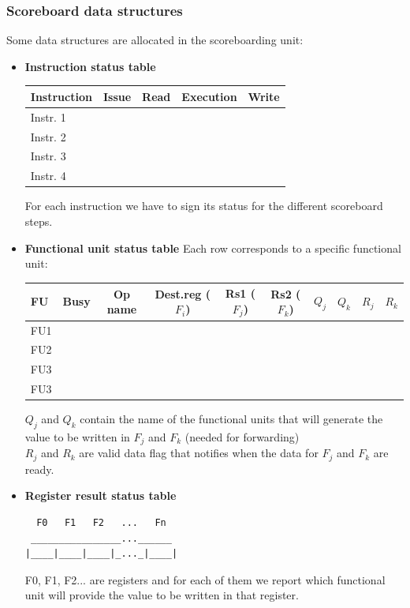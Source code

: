 \subsubsection{Scoreboard data structures}
Some data structures are allocated in the scoreboarding unit:
\begin{itemize}
\item \textbf{Instruction status table}
\begin{center}
  \begin{tabular}{|l|c|c|c|c|}
    \hline
    Instruction&  Issue&    Read&  Execution&   Write\\
    \hline
    Instr. 1  & & & &  \\
    Instr. 2  & & & &  \\
    Instr. 3  & & & &  \\
    Instr. 4  & & & &  \\
    \hline
  \end{tabular}
\end{center}
For each instruction we have to sign its status for the different scoreboard
steps.

\item \textbf{Functional unit status table}
Each row corresponds to a specific functional unit:
\begin{center}
  \begin{tabular}{|l|c|c|c|c|c|c|c|c|c|}
    \hline
    FU &Busy& Op name &  Dest.reg ($F_i$)& Rs1
    ($F_j$)&
    Rs2 ($F_k$)& $Q_j$& $Q_k$& $R_j$&  $R_k$\\
    \hline
    FU1 & & & & & & & & & \\
    FU2 & & & & & & & & & \\
    FU3 & & & & & & & & & \\
    FU3 & & & & & & & & & \\
    \hline
\end{tabular}
\end{center}
$Q_j$ and $Q_k$ contain the name of the functional units that will generate the
value to be written in $F_j$ and $F_k$ (needed for forwarding)\\ $R_j$ and
$R_k$ are valid data flag that notifies when the data for $F_j$ and $F_k$ are
ready.

\item \textbf{Register result status table}

\begin{verbatim}
  F0   F1   F2   ...   Fn
 ________________...______
|____|____|____|_..._|____|
\end{verbatim}
F0, F1, F2... are registers and for each of them we report which functional
unit will provide the value to be written in that register.
\end{itemize}

